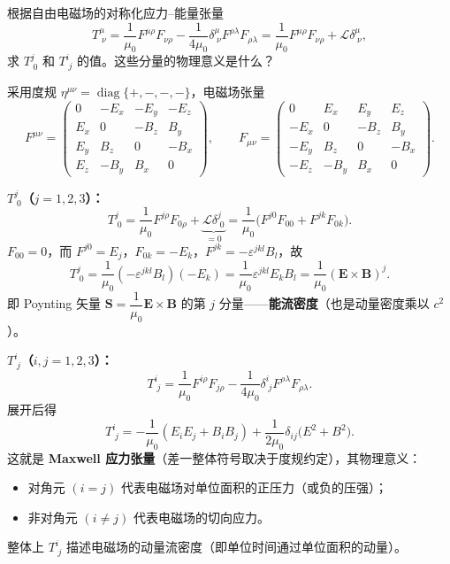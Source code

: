 \begin{question}
根据自由电磁场的对称化应力--能量张量
\[
T^\mu_{\;\nu}= \frac1{\mu_0}F^{\mu\rho}F_{\nu\rho}
-\frac1{4\mu_0}\delta^\mu_{\;\nu}F^{\rho\lambda}F_{\rho\lambda}
= \frac1{\mu_0}F^{\mu\rho}F_{\nu\rho}+\mathcal L\delta^\mu_{\;\nu},
\]
求 \(T^j_{\;0}\) 和 \(T^i_{\;j}\) 的值。这些分量的物理意义是什么？
\begin{solution}
采用度规 \(\eta^{\mu\nu}=\operatorname{diag}\{+,-,-,-\}\)，电磁场张量
\[
F^{\mu\nu}=
\begin{pmatrix}
0 & -E_x & -E_y & -E_z\\
E_x & 0 & -B_z & B_y\\
E_y & B_z & 0 & -B_x\\
E_z & -B_y & B_x & 0
\end{pmatrix},
\qquad
F_{\mu\nu}=
\begin{pmatrix}
0 & E_x & E_y & E_z\\
-E_x & 0 & -B_z & B_y\\
-E_y & B_z & 0 & -B_x\\
-E_z & -B_y & B_x & 0
\end{pmatrix}.
\]

\textbf{\(T^j_{\;0}\)（\(j=1,2,3\)）：}
\[
T^j_{\;0}= \frac1{\mu_0}F^{j\rho}F_{0\rho}
+\underbrace{\mathcal L\delta^j_{\;0}}_{=0}
= \frac1{\mu_0}\bigl(F^{j0}F_{00}+F^{jk}F_{0k}\bigr).
\]
\(F_{00}=0\)，而 \(F^{j0}=E_j\)，\(F_{0k}=-E_k\)，\(F^{jk}=-\varepsilon^{jkl}B_l\)，故
\[
T^j_{\;0}= \frac1{\mu_0}(-\varepsilon^{jkl}B_l)(-E_k)
= \frac1{\mu_0}\varepsilon^{jkl}E_kB_l = \frac1{\mu_0}(\boldsymbol E\times\boldsymbol B)^j .
\]
即 Poynting 矢量 \(\boldsymbol S=\dfrac1{\mu_0}\boldsymbol E\times\boldsymbol B\) 的第 \(j\) 分量——\textbf{能流密度}（也是动量密度乘以 \(c^2\)）。

\textbf{\(T^i_{\;j}\)（\(i,j=1,2,3\)）：}
\[
T^i_{\;j}= \frac1{\mu_0}F^{i\rho}F_{j\rho}
-\frac1{4\mu_0}\delta^i_{\;j}F^{\rho\lambda}F_{\rho\lambda}.
\]
展开后得
\[
T^i_{\;j}= -\frac1{\mu_0}\!\left(E_iE_j + B_iB_j\right)
+\frac1{2\mu_0}\delta_{ij}\bigl(E^2+B^2\bigr).
\]
这就是 \textbf{Maxwell 应力张量}（差一整体符号取决于度规约定），其物理意义：
\begin{itemize}
  \item 对角元 \((i=j)\) 代表电磁场对单位面积的正压力（或负的压强）；
  \item 非对角元 \((i\neq j)\) 代表电磁场的切向应力。
\end{itemize}
整体上 \(T^i_{\;j}\) 描述电磁场的动量流密度（即单位时间通过单位面积的动量）。
\end{solution}
\end{question}

